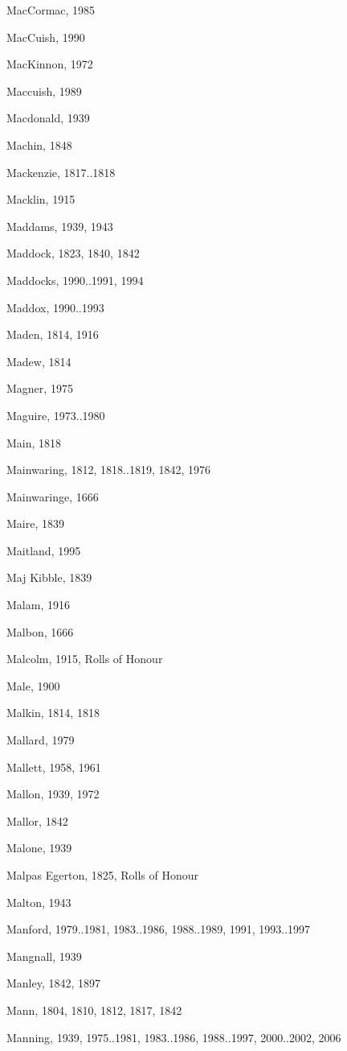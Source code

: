 {\begin{theindex}
\item MacCormac, 1985
\item MacCuish, 1990
\item MacKinnon, 1972
\item Maccuish, 1989
\item Macdonald, 1939
\item Machin, 1848
\item Mackenzie, 1817..1818
\item Macklin, 1915
\item Maddams, 1939, 1943
\item Maddock, 1823, 1840, 1842
\item Maddocks, 1990..1991, 1994
\item Maddox, 1990..1993
\item Maden, 1814, 1916
\item Madew, 1814
\item Magner, 1975
\item Maguire, 1973..1980
\item Main, 1818
\item Mainwaring, 1812, 1818..1819, 1842, 1976
\item Mainwaringe, 1666
\item Maire, 1839
\item Maitland, 1995
\item Maj Kibble, 1839
\item Malam, 1916
\item Malbon, 1666
\item Malcolm, 1915, Rolls of Honour
\item Male, 1900
\item Malkin, 1814, 1818
\item Mallard, 1979
\item Mallett, 1958, 1961
\item Mallon, 1939, 1972
\item Mallor, 1842
\item Malone, 1939
\item Malpas Egerton, 1825, Rolls of Honour
\item Malton, 1943
\item Manford, 1979..1981, 1983..1986, 1988..1989, 1991, 1993..1997
\item Mangnall, 1939
\item Manley, 1842, 1897
\item Mann, 1804, 1810, 1812, 1817, 1842
\item Manning, 1939, 1975..1981, 1983..1986, 1988..1997, 2000..2002, 2006

\end{theindex}}
